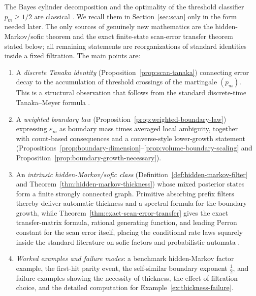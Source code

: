 The Bayes cylinder decomposition and the optimality of the threshold classifier
$p_m\ge 1/2$ are classical
\cite{Tsybakov2009Nonparametric,DevroyeGyorfiLugosi1996}.  We recall them in
Section~\ref{sec:scan} only in the form needed later.  The only sources of
genuinely new mathematics are the hidden-Markov/sofic theorem and the exact
finite-state scan-error transfer theorem stated below;
all remaining statements are reorganizations of standard identities inside a
fixed filtration.  The main points are:
\begin{enumerate}[label=(\roman*)]
\item A \emph{discrete Tanaka identity}
  (Proposition~\ref{prop:scan-tanaka}) connecting error decay to the accumulation
  of threshold crossings of the martingale $(p_m)$.  This is a structural
  observation that follows from the standard discrete-time Tanaka--Meyer
  formula \cite{LochowskiOblojPromelSiopaes2021}.
\item A \emph{weighted boundary law}
  (Proposition~\ref{prop:weighted-boundary-law}) expressing $\varepsilon_m$ as
  boundary mass times averaged local ambiguity, together with count-based
  consequences and a converse-style lower-growth statement
  (Propositions~\ref{prop:boundary-dimension}--\ref{prop:volume-boundary-scaling}
  and Proposition~\ref{prop:boundary-growth-necessary}).
\item An \emph{intrinsic hidden-Markov/sofic class}
  (Definition~\ref{def:hidden-markov-filter} and
  Theorem~\ref{thm:hidden-markov-thickness}) whose mixed posterior states form
  a finite strongly connected graph.  Primitive absorbing prefix filters thereby
  deliver automatic thickness and a spectral formula for the boundary growth,
  while Theorem~\ref{thm:exact-scan-error-transfer} gives the exact
  transfer-matrix formula, rational generating function, and leading Perron
  constant for the scan error itself,
  placing the conditional rate laws squarely inside the standard literature on
  sofic factors and probabilistic automata
  \cite{Blackwell1957,Heller1965,BaumPetrie1966,BoylePetersenHMP,PollicottKempton2016,Verbitskiy2011,Rabin1963,Paz1971,PerrinPin2004}.
\item \emph{Worked examples and failure modes}: a benchmark hidden-Markov
  factor example, the first-hit parity event, the self-similar boundary exponent
  $\frac12$, and failure examples showing the necessity of thickness, the effect
  of filtration choice, and the detailed computation for
  Example~\ref{ex:thickness-failure}.
\end{enumerate}
